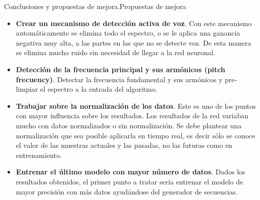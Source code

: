 \begin{frame}{Conclusiones y propuestas de mejora.\newline Propuestas de mejora}
	\begin{itemize}
		\item \textbf{Crear un mecanismo de detección activa de voz}. Con este mecanismo automáticamente se elimina todo el espectro, o se le aplica una ganancia negativa muy alta, a las partes en las que no se detecte voz. De esta manera se elimina mucho ruido sin necesidad de llegar a la red neuronal.
		\vspace*{10pt}
		\item \textbf{Detección de la frecuencia principal y sus armónicos (pitch frecuency)}. Detectar la frecuencia fundamental y sus armónicos y pre-limpiar el espectro a la entrada del algoritmo.
		\vspace*{10pt}
		\item \textbf{Trabajar sobre la normalización de los datos}. Este es uno de los puntos con mayor influencia sobre los resultados. Los resultados de la red variaban mucho con datos normalizados o sin normalización. Se debe plantear una normalización que sea posible aplicarla en tiempo real, es decir sólo se conoce el valor de las muestras actuales y las pasadas, no las futuras como en entrenamiento.
		\vspace*{10pt}
		\item \textbf{Entrenar el último modelo con mayor número de datos}. Dados los resultados obtenidos, el primer punto a tratar sería entrenar el modelo de mayor precisión con más datos ayudándose del generador de secuencias.
	\end{itemize}
\end{frame}